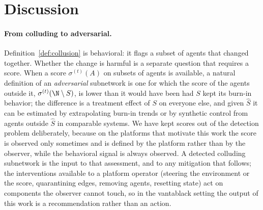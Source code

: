 \section{Discussion}
\label{sec:discussion}

\paragraph{From colluding to adversarial.}
Definition~\ref{def:collusion} is behavioral: it flags a subset of agents that changed together. Whether the change is harmful is a separate question that requires a score. When a score $\sigma^{(t)}(A)$ on subsets of agents is available, a natural definition of an \emph{adversarial} subnetwork is one for which the score of the agents outside it, $\sigma^{(t)}(\N\setminus S)$, is lower than it would have been had $S$ kept its burn-in behavior; the difference is a treatment effect of $S$ on everyone else, and given $\hat S$ it can be estimated by extrapolating burn-in trends or by synthetic control from agents outside $\hat S$ in comparable systems. We have kept scores out of the detection problem deliberately, because on the platforms that motivate this work the score is observed only sometimes and is defined by the platform rather than by the observer, while the behavioral signal is always observed. A detected colluding subnetwork is the input to that assessment, and to any mitigation that follows; the interventions available to a platform operator (steering the environment or the score, quarantining edges, removing agents, resetting state) act on components the observer cannot touch, so in the vantablack setting the output of this work is a recommendation rather than an action.

